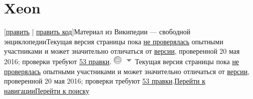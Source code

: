\documentclass[a4paper,11pt]{article}
\begin{document}
\section{Xeon}[\href{https://ru.wikipedia.org/w/index.php?title=Xeon&amp;veaction=edit&amp;section=0}{править} | \href{https://ru.wikipedia.org/w/index.php?title=Xeon&amp;action=edit&amp;section=0&amp;summary=/*%20%D0%9F%D1%80%D0%B5%D0%B0%D0%BC%D0%B1%D1%83%D0%BB%D0%B0%20*/%20}{править код}]Материал из Википедии — свободной энциклопедииТекущая версия страницы пока \href{https://ru.wikipedia.org/wiki/%D0%92%D0%B8%D0%BA%D0%B8%D0%BF%D0%B5%D0%B4%D0%B8%D1%8F:%D0%9F%D1%80%D0%BE%D0%B2%D0%B5%D1%80%D0%BA%D0%B0_%D1%81%D1%82%D0%B0%D1%82%D0%B5%D0%B9/%D0%9F%D0%BE%D1%8F%D1%81%D0%BD%D0%B5%D0%BD%D0%B8%D0%B5_%D0%B4%D0%BB%D1%8F_%D1%87%D0%B8%D1%82%D0%B0%D1%82%D0%B5%D0%BB%D0%B5%D0%B9}{не проверялась} опытными участниками и может значительно отличаться от \href{https://ru.wikipedia.org/w/index.php?title=Xeon&amp;stable=1}{версии}, проверенной 20 мая 2016; проверки требуют \href{https://ru.wikipedia.org/w/index.php?title=Xeon&amp;oldid=78432884&amp;diff=cur&amp;diffonly=0}{53 правки}.
\includegraphics{xeon_files/1.png}
\includegraphics{xeon_files/arrow-down.png}Текущая версия страницы пока \href{https://ru.wikipedia.org/wiki/%D0%92%D0%B8%D0%BA%D0%B8%D0%BF%D0%B5%D0%B4%D0%B8%D1%8F:%D0%9F%D1%80%D0%BE%D0%B2%D0%B5%D1%80%D0%BA%D0%B0_%D1%81%D1%82%D0%B0%D1%82%D0%B5%D0%B9/%D0%9F%D0%BE%D1%8F%D1%81%D0%BD%D0%B5%D0%BD%D0%B8%D0%B5_%D0%B4%D0%BB%D1%8F_%D1%87%D0%B8%D1%82%D0%B0%D1%82%D0%B5%D0%BB%D0%B5%D0%B9}{не проверялась} опытными участниками и может значительно отличаться от \href{https://ru.wikipedia.org/w/index.php?title=Xeon&amp;stable=1}{версии}, проверенной 20 мая 2016; проверки требуют \href{https://ru.wikipedia.org/w/index.php?title=Xeon&amp;oldid=78432884&amp;diff=cur&amp;diffonly=0}{53 правки}.\hyperlink{mw-head}{Перейти к навигации}\hyperlink{p-search}{Перейти к поиску}
\end{document}

